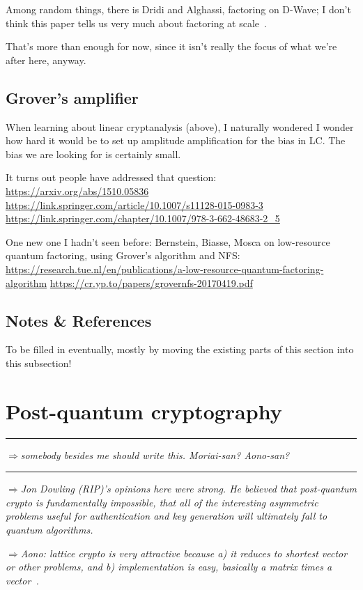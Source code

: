 \documentclass[%
 aip,
 jmp,%
 amsmath,amssymb,
 reprint,%
]{revtex4-1}
\def\outlinecomment#1{\hrule{\color{Blue}$\Rightarrow${\small\em #1}}\hrule}
\def\comment#1{{\color{ForestGreen}$\Rightarrow${\small\em #1}}}
\begin{document}
Among random things, there is Dridi and Alghassi,
factoring on D-Wave; I don’t think this paper tells us very much about factoring at scale~\cite{dridi2017prime}.

That's more than enough for now, since it isn't really the focus of
what we're after here, anyway.

\subsection{Grover's amplifier}

When learning about linear cryptanalysis (above), I naturally wondered
I wonder how hard it would be to set up amplitude amplification for
the bias in LC.  The bias we are looking for is certainly small.

It turns out people have addressed that question:
\url{https://arxiv.org/abs/1510.05836}
\url{https://link.springer.com/article/10.1007/s11128-015-0983-3}
\url{https://link.springer.com/chapter/10.1007/978-3-662-48683-2_5}

One new one I hadn't seen before:
Bernstein, Biasse, Mosca on low-resource quantum factoring, using
Grover's algorithm and NFS:
\url{https://research.tue.nl/en/publications/a-low-resource-quantum-factoring-algorithm}
\url{https://cr.yp.to/papers/grovernfs-20170419.pdf}

\subsection{Notes \& References}

To be filled in eventually, mostly by moving the existing parts of
this section into this subsection!

\section{Post-quantum cryptography}

\outlinecomment{somebody besides me should write this.  Moriai-san?
  Aono-san?}

\comment{Jon Dowling (RIP)'s opinions here were strong.  He believed that
  post-quantum crypto is fundamentally impossible, that all of the
  interesting asymmetric problems useful for authentication and key
  generation will ultimately fall to quantum algorithms.}

\comment{Aono: lattice crypto is very attractive because a) it reduces to
shortest vector or other problems, and b) implementation is easy,
basically a matrix times a vector~\cite{regev09:jacm}.}
\end{document}
